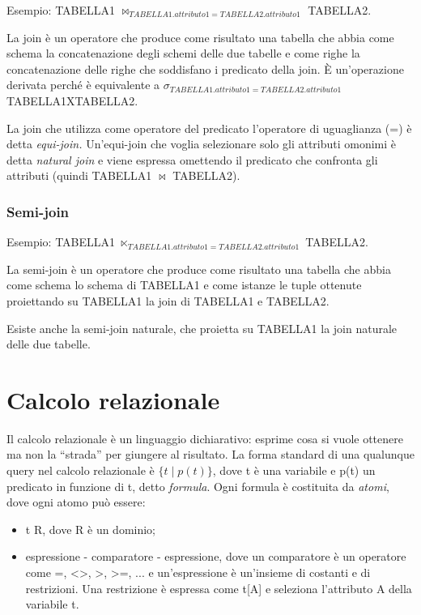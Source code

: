 \documentclass[\main/main.tex]{subfiles}
\begin{document}
Esempio: TABELLA1 $\bowtie_{TABELLA1.attributo1=TABELLA2.attributo1}$ TABELLA2.

La join è un operatore che produce come risultato una tabella che abbia come schema la concatenazione degli schemi delle due tabelle e come righe la concatenazione delle righe che soddisfano i predicato della join.
È un'operazione derivata perché è equivalente a $\sigma_{TABELLA1.attributo1=TABELLA2.attributo1}$ TABELLA1XTABELLA2.

La join che utilizza come operatore del predicato l'operatore di uguaglianza (=) è detta \textit{equi-join.}
Un'equi-join che voglia selezionare solo gli attributi omonimi è detta \textit{natural join} e viene espressa omettendo il predicato che confronta gli attributi (quindi TABELLA1 $\bowtie$ TABELLA2).


\subsubsection{Semi-join}

Esempio: TABELLA1 $\ltimes_{TABELLA1.attributo1=TABELLA2.attributo1}$ TABELLA2.

La semi-join è un operatore che produce come risultato una tabella che abbia come schema lo schema di TABELLA1 e come istanze le tuple ottenute proiettando su TABELLA1 la join di TABELLA1 e TABELLA2.

Esiste anche la semi-join naturale, che proietta su TABELLA1 la join naturale delle due tabelle.


\section{Calcolo relazionale}
Il calcolo relazionale è un linguaggio dichiarativo: esprime cosa si vuole ottenere ma non la ``strada'' per giungere al risultato.
La forma standard di una qualunque query nel calcolo relazionale è $\{ t \mid p(t) \}$, dove t è una variabile e p(t) un predicato in funzione di t, detto \textit{formula}.
Ogni formula è costituita da \textit{atomi}, dove ogni atomo può essere:
\begin{itemize}
  \item t \in R, dove R è un dominio;
  \item espressione - comparatore - espressione, dove un comparatore è un operatore come =, <>, >, >=, ... e un'espressione è un'insieme di costanti e di restrizioni. Una restrizione è espressa come t[A] e seleziona l'attributo A della variabile t.
\end{itemize}
\end{document}
